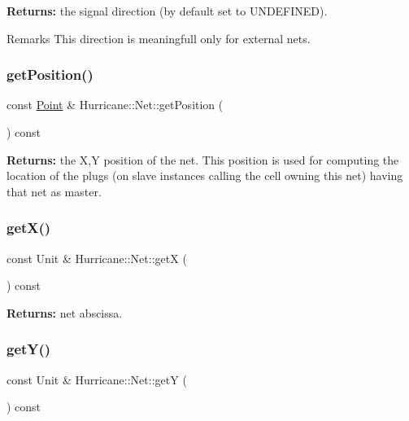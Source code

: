 {\bfseries Returns\+:} the signal direction (by default set to U\+N\+D\+E\+F\+I\+N\+ED).

\begin{DoxyRemark}{Remarks}
This direction is meaningfull only for external nets. 
\end{DoxyRemark}
\mbox{\label{classHurricane_1_1Net_abcfdec9c953d228845fdb9d75e8173cc}} 
\subsubsection{\texorpdfstring{get\+Position()}{getPosition()}}
{\footnotesize\ttfamily const \mbox{\hyperlink{classHurricane_1_1Point}{Point}} \& Hurricane\+::\+Net\+::get\+Position (\begin{DoxyParamCaption}{ }\end{DoxyParamCaption}) const\hspace{0.3cm}{\ttfamily [inline]}}

{\bfseries Returns\+:} the X,Y position of the net. This position is used for computing the location of the plugs (on slave instances calling the cell owning this net) having that net as master. \mbox{\label{classHurricane_1_1Net_a1f8f4c4632614b84a1227a1da8310428}} 
\subsubsection{\texorpdfstring{get\+X()}{getX()}}
{\footnotesize\ttfamily const Unit \& Hurricane\+::\+Net\+::getX (\begin{DoxyParamCaption}{ }\end{DoxyParamCaption}) const\hspace{0.3cm}{\ttfamily [inline]}}

{\bfseries Returns\+:} net abscissa. \mbox{\label{classHurricane_1_1Net_aa97899b408aa47ec22792b5c6d6e9216}} 
\subsubsection{\texorpdfstring{get\+Y()}{getY()}}
{\footnotesize\ttfamily const Unit \& Hurricane\+::\+Net\+::getY (\begin{DoxyParamCaption}{ }\end{DoxyParamCaption}) const\hspace{0.3cm}{\ttfamily [inline]}}


